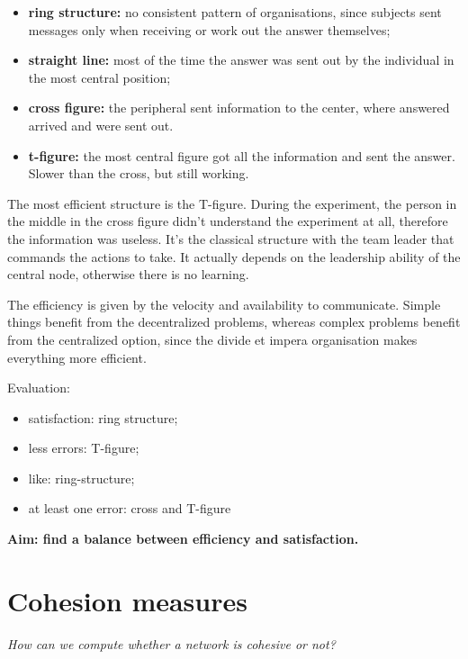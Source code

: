 \documentclass[
  notitlepage,
  onecolumn,
  openany]{book}
\providecommand{\tightlist}{%
  \setlength{\itemsep}{0pt}\setlength{\parskip}{0pt}}
\begin{document}
\begin{itemize}
\tightlist
\item
  \textbf{ring structure:} no consistent pattern of organisations, since subjects sent messages only when receiving or work out the answer themselves;
\item
  \textbf{straight line:} most of the time the answer was sent out by the individual in the most central position;
\item
  \textbf{cross figure:} the peripheral sent information to the center, where answered arrived and were sent out.
\item
  \textbf{t-figure:} the most central figure got all the information and sent the answer. Slower than the cross, but still working.
\end{itemize}

The most efficient structure is the T-figure. During the experiment, the person in the middle in the cross figure didn't understand the experiment at all, therefore the information was useless. It's the classical structure with the team leader that commands the actions to take. It actually depends on the leadership ability of the central node, otherwise there is no learning.

The efficiency is given by the velocity and availability to communicate. Simple things benefit from the decentralized problems, whereas complex problems benefit from the centralized option, since the divide et impera organisation makes everything more efficient.

Evaluation:

\begin{itemize}
\tightlist
\item
  satisfaction: ring structure;
\item
  less errors: T-figure;
\item
  like: ring-structure;
\item
  at least one error: cross and T-figure
\end{itemize}

\textbf{Aim: find a balance between efficiency and satisfaction.}

\hypertarget{cohesion-measures}{%
\chapter{Cohesion measures}\label{cohesion-measures}}

\emph{How can we compute whether a network is cohesive or not?}
\end{document}
